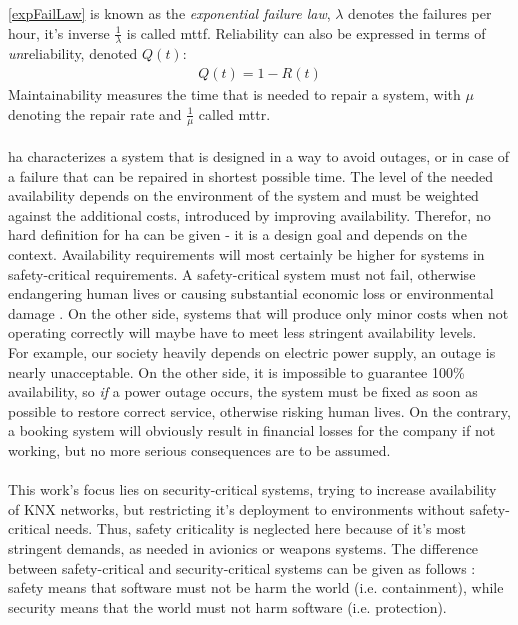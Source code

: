 \ref{expFailLaw} is known as the \textit{exponential failure law}, $\lambda$ denotes the failures per hour, it's inverse $\frac{1}{\lambda}$ is
called \gls{mttf}. Reliability can also be expressed in terms of \textit{un}reliability, denoted $Q(t)$:
\begin{align}
 Q(t) = 1 - R(t)
\end{align}
Maintainability measures the time that is needed to repair a system, with $\mu$ denoting the repair rate and $\frac{1}{\mu}$ called \gls{mttr}.
\\
\\
\gls{ha} characterizes a system that is designed in a way to avoid outages, or in case of a failure that can be repaired in shortest possible time. 
The level of the needed availability depends on the environment of the system and must be weighted against the additional costs, introduced by improving availability.
Therefor, no hard definition for \gls{ha} can be given - it is a design goal and depends on the context. Availability requirements will most certainly be higher
for systems in safety-critical requirements. A safety-critical system must not fail, otherwise endangering human lives or 
causing substantial economic loss or environmental damage \cite{1007998}.
On the other side, systems that will produce only minor costs when not operating correctly
will maybe have to meet less stringent availability levels.
\\
For example, our society heavily depends on electric power supply, an outage
is nearly unacceptable. On the other side, it is impossible to guarantee 100\% availability, so \textit{if} a power outage occurs, the system must be fixed as soon as
possible to restore correct service, otherwise risking human lives. On the contrary, a booking system will obviously result in financial losses for the company 
if not working, but no more serious consequences are to be assumed.
\\
\\
This work's focus lies on security-critical systems, trying to increase availability of KNX networks, but restricting it's deployment to
environments without safety-critical needs. Thus, safety criticality is neglected here because of it's most stringent demands, as needed in avionics
or weapons systems.
The difference between safety-critical and security-critical systems can be given as follows \cite{5784222}: safety means that software must not be harm the 
world (i.e. containment), while security means that the world must not harm software (i.e. protection). 
\\
